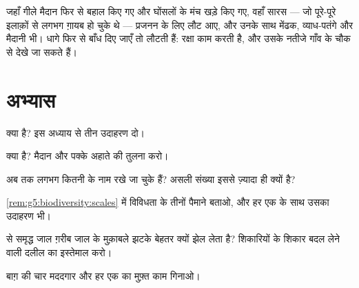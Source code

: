 \begin{example}[सारसों की वापसी]\label{ex:g5:biodiversity:storks}
जहाँ गीले मैदान फिर से बहाल किए गए और घोंसलों के मंच खड़े किए गए, वहाँ
सारस --- जो पूरे-पूरे इलाक़ों से लगभग ग़ायब हो चुके थे --- प्रजनन के
लिए लौट आए, और उनके साथ मेंढक, व्याध-पतंगे और मैदानी  भी। धागे फिर
से बाँध दिए जाएँ तो  लौटती हैं: रक्षा काम करती है, और उसके
नतीजे गाँव के चौक से देखे जा सकते हैं।
\end{example}

\section{अभ्यास}

\begin{exercise}[$\star$]\label{exo:g5:biodiversity:1}
 क्या है? इस अध्याय से तीन उदाहरण दो।
\end{exercise}

\begin{exercise}[$\star$]\label{exo:g5:biodiversity:2}
 क्या है? मैदान और पक्के अहाते की तुलना करो।
\end{exercise}

\begin{exercise}[$\star$]\label{exo:g5:biodiversity:3}
अब तक लगभग कितनी  के नाम रखे जा चुके हैं? असली संख्या इससे
ज़्यादा ही क्यों है?
\end{exercise}

\begin{exercise}[$\star$]\label{exo:g5:biodiversity:4}
\cref{rem:g5:biodiversity:scales} में विविधता के तीनों पैमाने बताओ, और
हर एक के साथ उसका उदाहरण भी।
\end{exercise}

\begin{exercise}[$\star$]\label{exo:g5:biodiversity:5}
 से समृद्ध जाल ग़रीब जाल के मुक़ाबले झटके बेहतर क्यों झेल
लेता है? शिकारियों के शिकार बदल लेने वाली दलील का इस्तेमाल करो।
\end{exercise}

\begin{exercise}[$\star$]\label{exo:g5:biodiversity:6}
बाग़ की चार मददगार  और हर एक का मुफ़्त काम गिनाओ।
\end{exercise}

